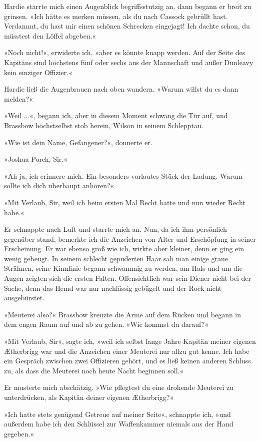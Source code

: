 Hardie starrte mich einen Augenblick begriffsstutzig an, dann
begann er breit zu grinsen. »Ich hätte es merken müssen, als du
nach Cassock gebrüllt hast. Verdammt, du hast mir einen schönen
Schrecken eingejagt! Ich dachte schon, du müsstest den Löffel
abgeben.«

»Noch nicht!«, erwiderte ich, »aber es könnte knapp werden. Auf der
Seite des Kapitäns sind höchstens fünf oder sechs aus der
Mannschaft und außer Dunleavy kein einziger Offizier.«

Hardie ließ die Augenbrauen nach oben wandern. »Warum willst du es
dann melden?«

»Weil ...«, begann ich, aber in diesem Moment schwang die Tür auf,
und Brassbow höchstselbst stob herein, Wilson in seinem
Schlepptau.

»Wie ist dein Name, Gefangener?«, donnerte er.

»Joshua Porch, Sir.«

«Ah ja, ich erinnere mich. Ein besonders vorlautes Stück der
Ladung. Warum sollte ich dich überhaupt anhören?«

»Mit Verlaub, Sir, weil ich beim ersten Mal Recht hatte und nun
wieder Recht habe.«

Er schnappte nach Luft und starrte mich an. Nun, da ich ihm
persönlich gegenüber stand, bemerkte ich die Anzeichen von Alter
und Erschöpfung in seiner Erscheinung. Er war ebenso groß wie ich,
wirkte aber kleiner, denn er ging ein wenig gebeugt. In seinem
schlecht gepuderten Haar sah man einige graue Strähnen, seine
Kinnlinie begann schwammig zu werden, am Hals und um die Augen
zeigten sich die ersten Falten. Offensichtlich war sein Diener
nicht bei der Sache, denn das Hemd war nur nachlässig gebügelt und
der Rock nicht ausgebürstet.

»Meuterei also?« Brassbow kreuzte die Arme auf dem Rücken und
begann in dem engen Raum auf und ab zu gehen. »Wie kommst du
darauf?«

»Mit Verlaub, Sir«, sagte ich, »weil ich selbst lange Jahre Kapitän
meiner eigenen Ætherbrigg war und die Anzeichen einer Meuterei nur
allzu gut kenne. Ich habe ein Gespräch zwischen zwei Offizieren
gehört, und es ließ keinen anderen Schluss zu, als dass die
Meuterei noch heute Nacht beginnen soll.«

Er musterte mich abschätzig. »Wie pflegtest du eine drohende
Meuterei zu unterdrücken, als Kapitän deiner eigenen Ætherbrigg?«

»Ich hatte stets genügend Getreue auf meiner Seite«, schnappte ich,
»und außerdem habe ich den Schlüssel zur Waffenkammer niemals aus
der Hand gegeben.«

